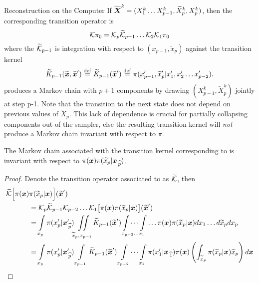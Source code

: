 \begin{chapter}{Reconstruction on the Computer}
If $\widetilde{\mbox{\boldmath$X$}}^k = (X_1^k\dots X_{p-1}^k,\widetilde X_{p}^k,X_p^k)$, then the corresponding transition operator is
\begin{equation}
  \mathcal K\pi_0 = \mathcal K_p \widetilde {\mathcal K}_{p-1}\dots \mathcal K_2 \mathcal K_1 \pi_0
\end{equation}
where the $\widetilde{\mathcal K}_{p-1}$ is integration with respect to $(x_{p-1},\tilde x_p)$ against the transition kernel
\begin{equation}
  \widetilde K_{p-1}(\widetilde{\mbox{\boldmath$x$}},\widetilde{\mbox{\boldmath$x$}}') \stackrel{\rm def}{=} \widetilde K_{p-1}(\widetilde{\mbox{\boldmath$x$}}') \stackrel{\rm def}{=} \pi(x_{p-1}',\widetilde x_p'|x_1',x_2'\dots x_{p-2}').
\end{equation}
 produces a Markov chain with $p+1$ components by drawing $(X_{p-1}^k,\tilde X_p^k)$ jointly at step p-1. 
Note that the transition to the next state does not depend on previous values of $\tilde X_p$.
This lack of dependence is crucial for partially collapsing components out of the sampler, else the resulting transition kernel will \emph{not} produce a Markov chain invariant with respect to $\pi$.
\begin{prop}\label{thm:conditionedGibbsStationary}
  The Markov chain associated with the transition kernel corresponding to  is invariant with respect to $\pi(\mbox{\boldmath$x$})\pi(\widetilde{x_p}|\mbox{\boldmath$x$}_{\,\widehat{p}})$.
\end{prop}
\begin{proof}
  Denote the transition operator associated to  as $\widetilde {\mathcal K}$, then
  \begin{align}
    \tilde\K\Big[ \pi(\vect x)&\pi(\tilde x_p|\vect x)\Big](\tilde{\vect x}') \nonumber \\ 
    &= \K_p \tilde\K_{p-1} \K_{p-2}\dots\K_{1} \big[\pi(\vect x)\pi(\tilde x_p|\vect x)\big](\tilde{\vect x}') \nonumber\\
    &= \int\limits_{x_p} \pi(x_p'|\rem xp')\iint\limits_{\tilde x_p,x_{p-1}}\tilde K_{p-1}(\tilde{\vect x}')\idotsint\limits_{x_{p-2}\dots x_1}\dots \pi(\vect x)\pi(\tilde x_p|\vect x)dx_1\dots d\tilde x_p dx_p \nonumber\\
    &=\int\limits_{x_p}\pi(x_p'|\rem xp') \int\limits_{x_{p-1}}\tilde K_{p-1}(\tilde{\vect x}')\int\limits_{x_{p-2}}\dots \int\limits_{x_1}\pi(x_1'|\rem x1)\pi(\vect x)\left(\int_{\tilde x_p}\pi(\tilde x_p|\vect x)\tilde x_p \right)d\vect x \label{eq:conditionedGibbsCalc}

\end{align}
\end{proof}
\end{chapter}
